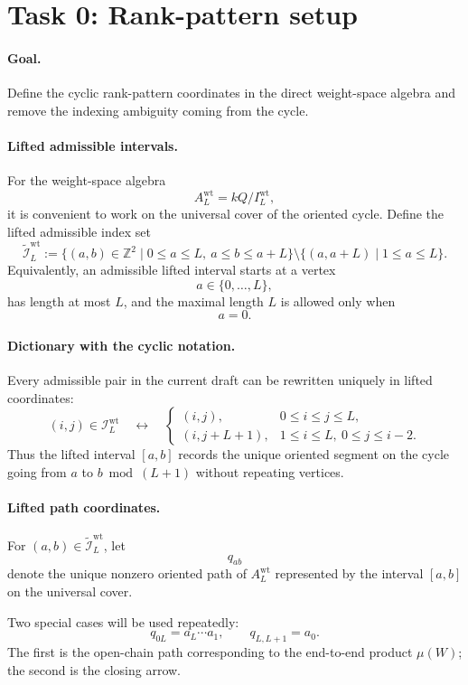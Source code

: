 \section*{Task 0: Rank-pattern setup}

\paragraph{Goal.}
Define the cyclic rank-pattern coordinates in the direct weight-space algebra and
remove the indexing ambiguity coming from the cycle.

\paragraph{Lifted admissible intervals.}
For the weight-space algebra
\[
A_L^{\mathrm{wt}}=kQ/I_L^{\mathrm{wt}},
\]
it is convenient to work on the universal cover of the oriented cycle. Define
the lifted admissible index set
\[
\widetilde{\mathcal I}_L^{\mathrm{wt}}
:=
\{(a,b)\in \mathbb Z^2 \mid 0\le a\le L,\ a\le b\le a+L\}
\setminus
\{(a,a+L)\mid 1\le a\le L\}.
\]
Equivalently, an admissible lifted interval starts at a vertex
\[
a\in\{0,\dots,L\},
\]
has length at most \(L\), and the maximal length \(L\) is allowed only when
\[
a=0.
\]

\paragraph{Dictionary with the cyclic notation.}
Every admissible pair in the current draft can be rewritten uniquely in lifted
coordinates:
\[
(i,j)\in \mathcal I_L^{\mathrm{wt}}
\quad\longleftrightarrow\quad
\begin{cases}
(i,j), & 0\le i\le j\le L,\\
(i,j+L+1), & 1\le i\le L,\ 0\le j\le i-2.
\end{cases}
\]
Thus the lifted interval \([a,b]\) records the unique oriented segment on the
cycle going from \(a\) to \(b \bmod (L+1)\) without repeating vertices.

\paragraph{Lifted path coordinates.}
For \((a,b)\in \widetilde{\mathcal I}_L^{\mathrm{wt}}\), let
\[
q_{ab}
\]
denote the unique nonzero oriented path of \(A_L^{\mathrm{wt}}\) represented by
the interval \([a,b]\) on the universal cover.

Two special cases will be used repeatedly:
\[
q_{0L}=a_L\cdots a_1,
\qquad
q_{L,L+1}=a_0.
\]
The first is the open-chain path corresponding to the end-to-end product
\(\mu(W)\); the second is the closing arrow.

